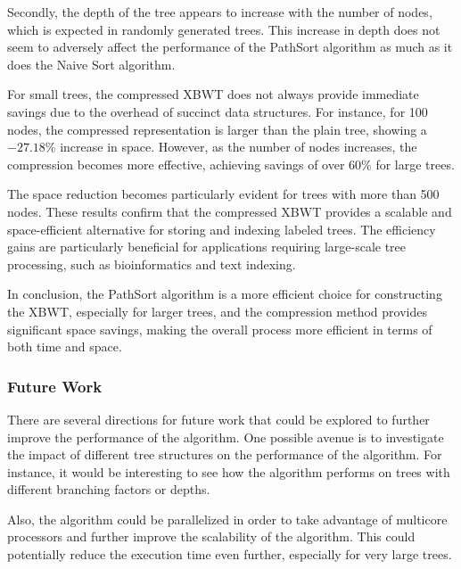 Secondly, the depth of the tree appears to increase with the number of nodes, which is expected in randomly generated trees. This increase in depth does not seem to adversely affect the performance of the PathSort algorithm as much as it does the Naive Sort algorithm.

For small trees, the compressed XBWT does not always provide immediate savings due to the overhead of succinct data structures. For instance, for 100 nodes, the compressed representation is larger than the plain tree, showing a \(-27.18\%\) increase in space. However, as the number of nodes increases, the compression becomes more effective, achieving savings of over 60\% for large trees.

The space reduction becomes particularly evident for trees with more than 500 nodes. These results confirm that the compressed XBWT provides a scalable and space-efficient alternative for storing and indexing labeled trees. The efficiency gains are particularly beneficial for applications requiring large-scale tree processing, such as bioinformatics and text indexing.

In conclusion, the PathSort algorithm is a more efficient choice for constructing the XBWT, especially for larger trees, and the compression method provides significant space savings, making the overall process more efficient in terms of both time and space.

\subsubsection{Future Work}
There are several directions for future work that could be explored to further improve the performance of the algorithm. One possible avenue is to investigate the impact of different tree structures on the performance of the algorithm. For instance, it would be interesting to see how the algorithm performs on trees with different branching factors or depths.

Also, the algorithm could be parallelized in order to take advantage of multicore processors and further improve the scalability of the algorithm. This could potentially reduce the execution time even further, especially for very large trees.
